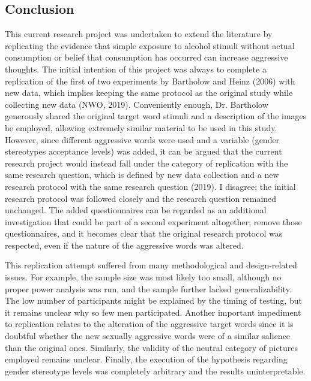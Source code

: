 \documentclass[authordate, serif, review]{jote-article}
\begin{document}
\begin{multicols}{2}
{}
\section*{Conclusion} \gotoreview
\label{sec:conclusion}

\noindent This current research project was undertaken to extend the literature by replicating the evidence that simple exposure to alcohol stimuli without actual consumption or belief that consumption has occurred can increase aggressive thoughts. The initial intention of this project was always to complete a replication of the first of two experiments by Bartholow and Heinz (2006) with new data, which implies keeping the same protocol as the original study while collecting new data (NWO, 2019). Conveniently enough, Dr. Bartholow generously shared the original target word stimuli and a description of the images he employed, allowing extremely similar material to be used in this study. However, since different aggressive words were used and a variable (gender stereotypes acceptance levels) was added, it can be argued that the current research project would instead fall under the category of replication with the same research question, which is defined by new data collection and a new research protocol with the same research question (2019). I disagree; the initial research protocol was followed closely and the research question remained unchanged. The added questionnaires can be regarded as an additional investigation that could be part of a second experiment altogether; remove those questionnaires, and it becomes clear that the original research protocol was respected, even if the nature of the aggressive words was altered.

This replication attempt suffered from many methodological and design-related issues. For example, the sample size was most likely too small, although no proper power analysis was run, and the sample further lacked generalizability. The low number of participants might be explained by the timing of testing, but it remains unclear why so few men participated. Another important impediment to replication relates to the alteration of the aggressive target words since it is doubtful whether the new sexually aggressive words were of a similar salience than the original ones. Similarly, the validity of the neutral category of pictures employed remains unclear. Finally, the execution of the hypothesis regarding gender stereotype levels was completely arbitrary and the results uninterpretable.


\end{multicols}
\end{document}
